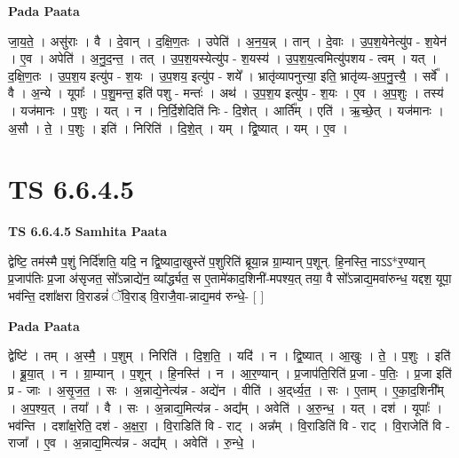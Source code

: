 \documentclass[17pt]{extarticle}
\begin{document}
\textbf{Pada Paata} \newline

जा॒य॒ते॒ । असु॑राः । वै । दे॒वान् । द॒क्षि॒ण॒तः । उपेति॑ । अ॒न॒य॒न्न् । तान् । दे॒वाः । उ॒प॒श॒येनेत्यु॑प - श॒येन॑ । ए॒व । अपेति॑ । अ॒नु॒द॒न्त॒ । तत् । उ॒प॒श॒यस्येत्यु॑प - श॒यस्य॑ । उ॒प॒श॒य॒त्वमित्यु॑पशय - त्वम् । यत् । द॒क्षि॒ण॒तः । उ॒प॒श॒य इत्यु॑प - श॒यः । उ॒प॒शय॒ इत्यु॑प - शये᳚ । भ्रातृ॑व्यापनुत्त्या॒ इति॒ भ्रातृ॑व्य-अ॒प॒नु॒त्त्यै॒ । सर्वे᳚ । वै । अ॒न्ये । यूपाः᳚ । प॒शु॒मन्त॒ इति॑ पशु - मन्तः॑ । अथ॑ । उ॒प॒श॒य इत्यु॑प - श॒यः । ए॒व । अ॒प॒शुः । तस्य॑ । यज॑मानः । प॒शुः । यत् । न । नि॒र्दि॒शेदिति॑ निः - दि॒शेत् । आर्ति᳚म् । एति॑ । ऋ॒च्छे॒त् । यज॑मानः । अ॒सौ । ते॒ । प॒शुः । इति॑ । निरिति॑ । दि॒शे॒त् । यम् । द्वि॒ष्यात् । यम् । ए॒व ।  \newline





\section{ TS 6.6.4.5 }

\textbf{TS 6.6.4.5 } \newline
\textbf{Samhita Paata} \newline

द्वेष्टि॒ तम॑स्मै प॒शुं निर्दि॑शति॒ यदि॒ न द्वि॒ष्यादा॒खुस्ते॑ प॒शुरिति॑ ब्रूया॒न्न ग्रा॒म्यान् प॒शून्. हि॒नस्ति॒ नाऽऽ*र॒ण्यान् प्र॒जाप॑तिः प्र॒जा अ॑सृजत॒ सो᳚ऽन्नाद्ये॑न॒ व्या᳚र्द्ध्यत॒ स ए॒तामे॑काद॒शिनी॑-मपश्य॒त् तया॒ वै सो᳚ऽन्नाद्य॒मवा॑रुन्ध॒ यद्दश॒ यूपा॒ भव॑न्ति॒ दशा᳚क्षरा वि॒राडन्नं॑ ॅवि॒राड् वि॒राजै॒वा-न्नाद्य॒मव॑ रुन्धे॒- [  ] \newline

\textbf{Pada Paata} \newline

द्वेष्टि॑ । तम् । अ॒स्मै॒ । प॒शुम् । निरिति॑ । दि॒श॒ति॒ । यदि॑ । न । द्वि॒ष्यात् । आ॒खुः । ते॒ । प॒शुः । इति॑ । ब्रू॒या॒त् । न । ग्रा॒म्यान् । प॒शून् । हि॒नस्ति॑ । न । आ॒र॒ण्यान् । प्र॒जाप॑ति॒रिति॑ प्र॒जा - प॒तिः॒ । प्र॒जा इति॑ प्र - जाः । अ॒सृ॒ज॒त॒ । सः । अ॒न्नाद्ये॒नेत्य॑न्न - अद्ये॑न । वीति॑ । अ॒द्‌र्ध्य॒त॒ । सः । ए॒ताम् । ए॒का॒द॒शिनी᳚म् । अ॒प॒श्य॒त् । तया᳚ । वै । सः । अ॒न्नाद्य॒मित्य॑न्न - अद्य᳚म् । अवेति॑ । अ॒रु॒न्ध॒ । यत् । दश॑ । यूपाः᳚ । भव॑न्ति । दशा᳚क्ष॒रेति॒ दश॑ - अ॒क्ष॒रा॒ । वि॒राडिति॑ वि - राट् । अन्न᳚म् । वि॒राडिति॑ वि - राट् । वि॒राजेति॑ वि - राजा᳚ । ए॒व । अ॒न्नाद्य॒मित्य॑न्न - अद्य᳚म् । अवेति॑ । रु॒न्धे॒ ।  \newline
\end{document}
